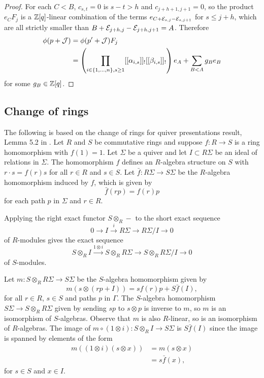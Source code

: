 \documentclass[a4paper, 11pt]{report}
\begin{document}
\begin{proof}
For each $C<B$, $c_{s,t}=0$ is $s-t>h$ and $c_{j+h+1,j+1}=0$, so the product $e_CF_j$ is a $\mathbb{Z}[q]$-linear combination of the terms $e_{C+\mathcal{E}_{s,j}-\mathcal{E}_{s,j+1}}$ for $s\le j+h$, which are all strictly smaller than $B+\mathcal{E}_{j+h,j}-\mathcal{E}_{j+h,j+1}=A$. Therefore
\begin{align*}
\phi(p+\mathcal{J})
&= \phi(p'+\mathcal{J})F_j\\
&= \left(\prod_{i\in\{1,\ldots,n\},s\geq 1} [[\alpha_{i,s}]]_![[\beta_{i,s}]]_!\right)e_A + \sum_{B<A} g_Be_B
\end{align*}
for some $g_B\in\mathbb{Z}[q]$.
\end{proof}


\subsection{Change of rings}

The following is based on the change of rings for quiver presentations result, Lemma 5.2 in \cite{su12}. Let $R$ and $S$ be commutative rings and suppose $f\colon R\to S$ is a ring homomorphism with $f(1)=1$. Let $\Sigma$ be a quiver and let $I\subset R\Sigma$ be an ideal of relations in $\Sigma$. The homomorphism $f$ defines an $R$-algebra structure on $S$ with $r\cdot s = f(r)s$ for all $r\in R$ and $s\in S$. Let $\bar{f}\colon R\Sigma\to S\Sigma$ be the $R$-algebra homomorphism induced by $f$, which is given by
\begin{equation*}
\bar{f}(rp)=f(r)p
\end{equation*}
for each path $p$ in $\Sigma$ and $r\in R$.

Applying the right exact functor $S\otimes_R -$ to the short exact sequence
\begin{equation*}
0\to I \overset{i}\to R\Sigma \to R\Sigma/{I} \to 0
\end{equation*}
of $R$-modules gives the exact sequence
\begin{equation*}
S\otimes_R I \overset{1\otimes i}\to S\otimes_R R\Sigma \to S\otimes_R R\Sigma/{I} \to 0
\end{equation*}
of $S$-modules.

Let $m\colon S\otimes_R R\Sigma\to S\Sigma$ be the $S$-algebra homomorphism given by
\begin{equation*}
m(s\otimes (rp+I)) = sf(r)p + S\bar{f}{(I)},
\end{equation*}
for all $r\in R$, $s\in S$ and paths $p$ in $\Gamma$. The $S$-algebra homomorphism $S\Sigma\to S\otimes_R R\Sigma$ given by sending $sp$ to $s\otimes p$ is inverse to $m$, so $m$ is an isomorphism of $S$-algebras. Observe that $m$ is also $R$-linear, so is an isomorphism of $R$-algebras. The image of $m\circ (1\otimes i)\colon S\otimes_R I \to S\Sigma$ is $S\bar{f}{(I)}$ since the image is spanned by elements of the form
\begin{align*}
m((1\otimes i)(s\otimes x))
&= m(s\otimes x)\\
&= s\bar{f}{(x)},
\end{align*}
for $s\in S$ and $x\in I$.
\end{document}

